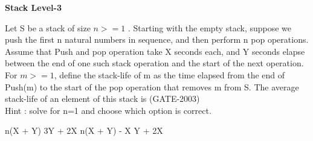
\centerline{\textbf{ \LARGE Stack Level-3}}

\begin{questyle}
  \question  Let S be a stack of size \(n >= 1\) . Starting with the empty stack, suppose we push the first n natural
            numbers in sequence, and then perform n pop operations. Assume that Push and pop operation take X seconds
            each, and Y seconds elapse between the end of one such stack operation and the start of the next operation.
            For \( m >= 1 \), define the stack-life of m as the time elapsed from the end of Push(m) to the start of the pop
            operation that removes m from S. The average stack-life of an element of this stack is  (GATE-2003) \\
            Hint : solve for n=1 and choose which option is correct.

  \begin{choices}
    \choice         n(X + Y)
    \choice         3Y + 2X
    \CorrectChoice  n(X + Y) - X
    \choice         Y + 2X
  \end{choices}
\end{questyle}

